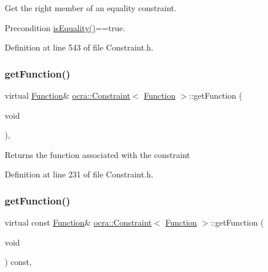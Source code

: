 Get the right member of an equality constraint.

\begin{DoxyPrecond}{Precondition}
\hyperlink{classocra_1_1Constraint_3_01Function_01_4_a3c7d085d888ef8937977129740d4c8a6}{is\+Equality()}==true. 
\end{DoxyPrecond}


Definition at line 543 of file Constraint.\+h.

\hypertarget{classocra_1_1Constraint_3_01Function_01_4_a81f1d8de34c0a123bc77d4798619fe9b}{}\label{classocra_1_1Constraint_3_01Function_01_4_a81f1d8de34c0a123bc77d4798619fe9b} 
\subsubsection{\texorpdfstring{get\+Function()}{getFunction()}\hspace{0.1cm}{\footnotesize\ttfamily [1/2]}}
{\footnotesize\ttfamily virtual \hyperlink{classocra_1_1Function}{Function}\& \hyperlink{classocra_1_1Constraint}{ocra\+::\+Constraint}$<$ \hyperlink{classocra_1_1Function}{Function} $>$\+::get\+Function (\begin{DoxyParamCaption}\item[{void}]{ }\end{DoxyParamCaption})\hspace{0.3cm}{\ttfamily [inline]}, {\ttfamily [virtual]}}

Returns the function associated with the constraint 

Definition at line 231 of file Constraint.\+h.

\hypertarget{classocra_1_1Constraint_3_01Function_01_4_ad7f2ac6dfb90ed0231cc3e73ef592581}{}\label{classocra_1_1Constraint_3_01Function_01_4_ad7f2ac6dfb90ed0231cc3e73ef592581} 
\subsubsection{\texorpdfstring{get\+Function()}{getFunction()}\hspace{0.1cm}{\footnotesize\ttfamily [2/2]}}
{\footnotesize\ttfamily virtual const \hyperlink{classocra_1_1Function}{Function}\& \hyperlink{classocra_1_1Constraint}{ocra\+::\+Constraint}$<$ \hyperlink{classocra_1_1Function}{Function} $>$\+::get\+Function (\begin{DoxyParamCaption}\item[{void}]{ }\end{DoxyParamCaption}) const\hspace{0.3cm}{\ttfamily [inline]}, {\ttfamily [virtual]}}



